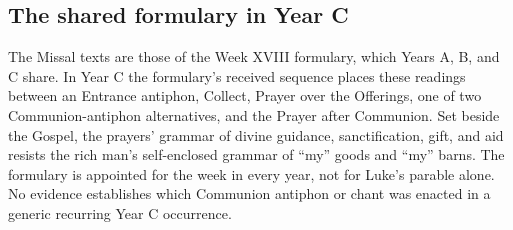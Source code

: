 \subsection*{The shared formulary in Year C}
The Missal texts are those of the Week XVIII formulary, which Years A, B, and
C share. In Year C the formulary's received sequence places these readings between an Entrance
antiphon, Collect, Prayer over the Offerings, one of two Communion-antiphon
alternatives, and the Prayer after Communion. Set beside the Gospel, the
prayers' grammar of divine guidance, sanctification, gift, and aid resists the
rich man's self-enclosed grammar of ``my'' goods and ``my'' barns. The formulary is appointed for the
week in every year, not for Luke's parable alone. No evidence establishes
which Communion antiphon or chant was enacted in a generic recurring Year C
occurrence.
